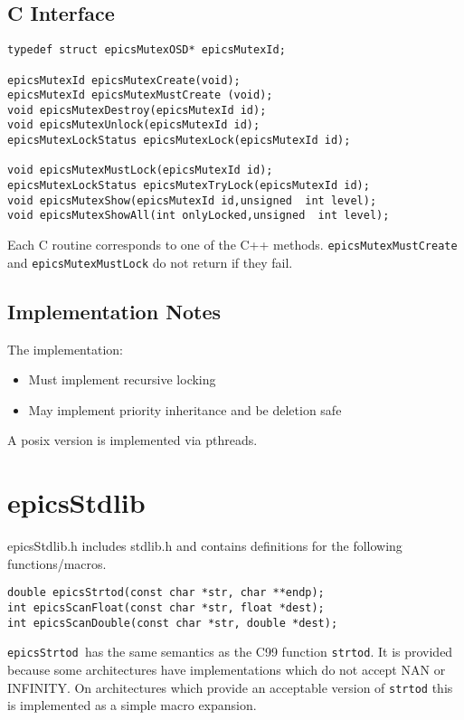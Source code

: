 \subsection{C Interface}

\begin{verbatim}typedef struct epicsMutexOSD* epicsMutexId;

epicsMutexId epicsMutexCreate(void);
epicsMutexId epicsMutexMustCreate (void);
void epicsMutexDestroy(epicsMutexId id);
void epicsMutexUnlock(epicsMutexId id);
epicsMutexLockStatus epicsMutexLock(epicsMutexId id);

void epicsMutexMustLock(epicsMutexId id);
epicsMutexLockStatus epicsMutexTryLock(epicsMutexId id);
void epicsMutexShow(epicsMutexId id,unsigned  int level);
void epicsMutexShowAll(int onlyLocked,unsigned  int level);
\end{verbatim}
Each C routine corresponds to one of the C++ methods. \verb|epicsMutexMustCreate| and \verb|epicsMutexMustLock| do 
not return if they fail.

\subsection{Implementation Notes}

The implementation:

\begin{itemize}\item Must implement recursive locking

\item May implement priority inheritance and be deletion safe

\end{itemize}A posix version is implemented via pthreads.

\section{epicsStdlib}

epicsStdlib.h includes stdlib.h and contains definitions for the following functions/macros.

\begin{verbatim}double epicsStrtod(const char *str, char **endp);
int epicsScanFloat(const char *str, float *dest);
int epicsScanDouble(const char *str, double *dest);
\end{verbatim}
\verb|epicsStrtod |has the same semantics as the C99 function \verb|strtod|.  It is provided because some architectures have 
implementations which do not accept NAN or INFINITY.   On architectures which provide an acceptable version of 
\verb|strtod| this is implemented as a simple macro expansion.

